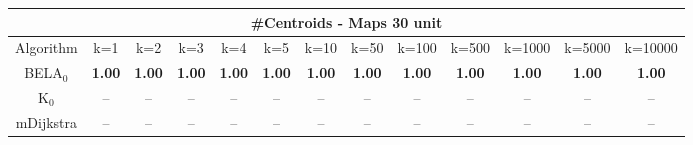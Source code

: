 \begin{tabular}{c|cccccccccccc}\toprule
\multicolumn{13}{c}{#Centroids - Maps 30 unit}\\ \midrule
Algorithm & k=1 & k=2 & k=3 & k=4 & k=5 & k=10 & k=50 & k=100 & k=500 & k=1000 & k=5000 & k=10000 \\ \midrule
BELA$_0$ & \textbf{1.00} & \textbf{1.00} & \textbf{1.00} & \textbf{1.00} & \textbf{1.00} & \textbf{1.00} & \textbf{1.00} & \textbf{1.00} & \textbf{1.00} & \textbf{1.00} & \textbf{1.00} & \textbf{1.00} \\
K$_0$ & -- & -- & -- & -- & -- & -- & -- & -- & -- & -- & -- & -- \\
mDijkstra & -- & -- & -- & -- & -- & -- & -- & -- & -- & -- & -- & -- \\ \bottomrule 
\end{tabular}
